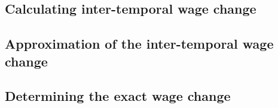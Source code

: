 \documentclass{article}
\begin{document}
\begin{appendix}
\section{Calculating inter-temporal wage change}

\subsection{Approximation of the inter-temporal wage change} \label{appen:wage_change_approx}

\subsection{Determining the exact wage change} \label{appen:wage_change}



\end{appendix}




%

\printbibliography
\end{document}
